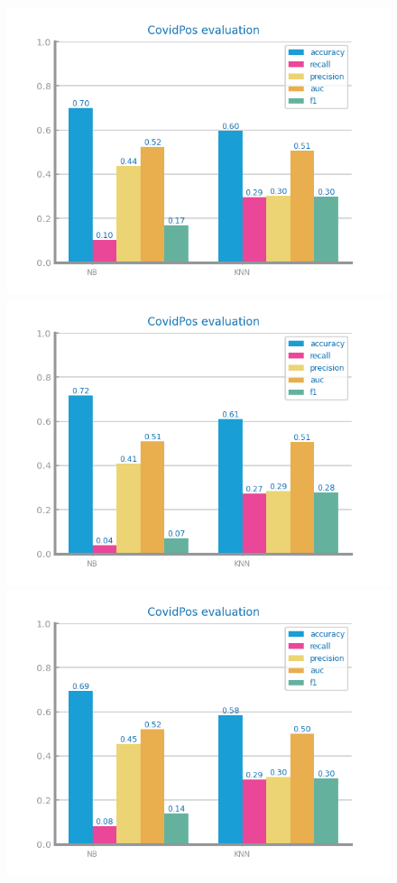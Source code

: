 \documentclass[10pt]{extarticle}
\begin{document}
\begin{figure}[H]
\centering\includegraphics[scale=0.80]{images/dataset1/data_preparation/CovidPos_outliers_treat_rep_fixed_median.png}
\includegraphics[scale=0.80]{images/dataset1/data_preparation/CovidPos_outliers_treat_rowDrop_NotStdBased.png}
\includegraphics[scale=0.80]{images/dataset1/data_preparation/CovidPos_outliers_treat_rowDrop_StdBased.png}

\end{figure}
\end{document}
